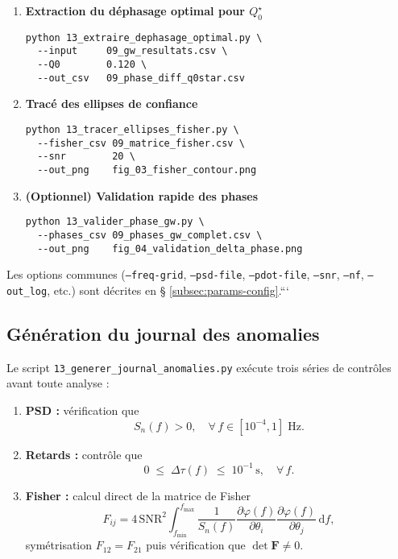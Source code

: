 \begin{enumerate}
  \item \textbf{Extraction du déphasage optimal pour \(Q_{0}^{\star}\)}
    \begin{verbatim}
python 13_extraire_dephasage_optimal.py \
  --input     09_gw_resultats.csv \
  --Q0        0.120 \
  --out_csv   09_phase_diff_q0star.csv
    \end{verbatim}

  \item \textbf{Tracé des ellipses de confiance}
    \begin{verbatim}
python 13_tracer_ellipses_fisher.py \
  --fisher_csv 09_matrice_fisher.csv \
  --snr        20 \
  --out_png    fig_03_fisher_contour.png
    \end{verbatim}

  \item \textbf{(Optionnel) Validation rapide des phases}
    \begin{verbatim}
python 13_valider_phase_gw.py \
  --phases_csv 09_phases_gw_complet.csv \
  --out_png    fig_04_validation_delta_phase.png
    \end{verbatim}
\end{enumerate}

\noindent Les options communes (\texttt{--freq-grid}, \texttt{--psd-file}, \texttt{--pdot-file}, \texttt{--snr}, \texttt{--nf}, \texttt{--out_log}, etc.) sont décrites en § \ref{subsec:params-config}.```

\subsection{Génération du journal des anomalies}
Le script \texttt{13\_generer\_journal\_anomalies.py} exécute trois séries de contrôles avant toute analyse :

\begin{enumerate}
  \item \textbf{PSD :} vérification que
    \[
      S_{n}(f) > 0,\quad\forall\,f\in[10^{-4},1]\;\mathrm{Hz}.
    \]
  \item \textbf{Retards :} contrôle que
    \[
      0 \;\le\;\Delta\tau(f)\;\le\;10^{-1}\,\mathrm{s},
      \quad\forall\,f.
    \]
  \item \textbf{Fisher :} calcul direct de la matrice de Fisher
    \[
      F_{ij}
      = 4\,\mathrm{SNR}^{2}
        \int_{f_{\min}}^{f_{\max}}
        \frac{1}{S_{n}(f)}
        \frac{\partial\varphi(f)}{\partial\theta_i}
        \frac{\partial\varphi(f)}{\partial\theta_j}
        \,\mathrm{d}f,
    \]
    symétrisation \(F_{12}=F_{21}\) puis vérification que
    \(\det\mathbf{F}\neq0\).
\end{enumerate}

